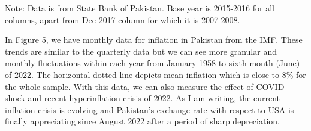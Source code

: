 \documentclass[12pt]{article}
\newcommand{\1}{\mathbbm 1}
\begin{document}
		
		
		\begin{table}[H]%
			\def\arraystretch{1}
			\begin{center}
				{\sc \caption{Annual National Inflation (December 2017 to December 2021)}}
				\begin{adjustbox}{width=0.8\textwidth}
					\setlength{\tabcolsep}{1pt}
				\end{adjustbox}
			\end{center}
			{\footnotesize{Note: Data is from State Bank of Pakistan. Base year is 2015-2016 for all columns, apart from Dec 2017 column for which it is 2007-2008.}} %
		\end{table}
		
		
			In Figure 5, we have monthly data for inflation in Pakistan from the IMF. These trends are similar to the quarterly data but we can see more granular and monthly fluctuations within each year from January 1958 to sixth month (June) of 2022. The horizontal dotted line depicts mean inflation which is close to 8\% for the whole sample. With this data, we can also measure the effect of COVID shock and recent hyperinflation crisis of 2022. As I am writing, the current inflation crisis is evolving and Pakistan's exchange rate with respect to USA is finally appreciating since August 2022 after a period of sharp depreciation.
		
\end{document}
